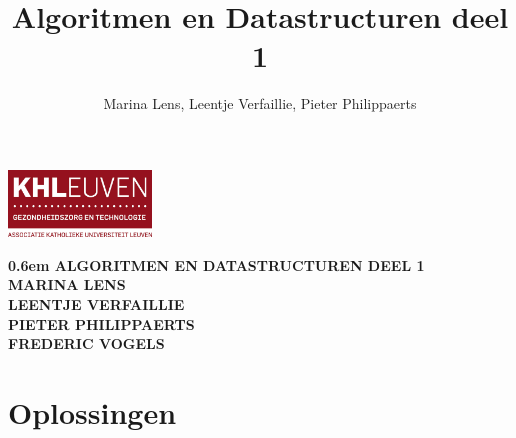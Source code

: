 \documentclass[a4paper,dutch,10pt]{book}
\title{Algoritmen en Datastructuren deel 1}
\author{Marina Lens, Leentje Verfaillie, Pieter Philippaerts}
\begin{document}
\clearpage
\newcommand\nbvspace[1][3]{\vspace*{\stretch{#1}}}
\newcommand\nbstretchyspace{\spaceskip0.5em plus 0.25em minus 0.25em}
\newcommand{\nbtitlestretch}{\spaceskip0.6em}


\includegraphics[width=1.5in]{GenT.jpg}
\thispagestyle{empty}
\begin{center}
\bfseries
\nbvspace[3]
\Huge
{\nbtitlestretch\huge
ALGORITMEN EN DATASTRUCTUREN}
\normalsize
DEEL 1 \\
\nbvspace[4]
\Large MARINA LENS\\[0.5em]
\Large LEENTJE VERFAILLIE\\[0.5em]
\Large PIETER PHILIPPAERTS\\[0.5em]
\Large FREDERIC VOGELS\\[0.5em]
\end{center}

\clearpage
\thispagestyle{empty}



\tableofcontents












\appendix


\chapter{Oplossingen}





\end{document}
